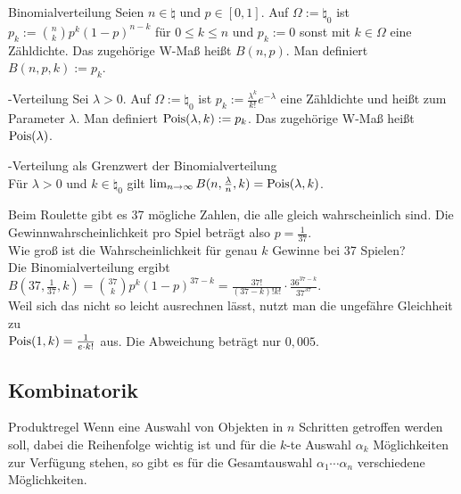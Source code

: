 \linie
\pagebreak

\begin{Def}{Binomialverteilung}
    Seien $n \in \natural$ und $p \in [0, 1]$.
    Auf $\Omega := \natural_0$ ist $p_k := \binom{n}{k} p^k (1 - p)^{n-k}$ für $0 \le k \le n$
    und $p_k := 0$ sonst mit $k \in \Omega$ eine Zähldichte.
    Das zugehörige W-Maß heißt  $B(n, p)$.
    Man definiert $B(n, p, k) := p_k$.
\end{Def}

\begin{Def}{-Verteilung}
    Sei $\lambda > 0$.
    Auf $\Omega := \natural_0$ ist $p_k := \frac{\lambda^k}{k!} e^{-\lambda}$ eine Zähldichte
    und heißt  zum Parameter $\lambda$.
    Man definiert $\text{Pois}(\lambda, k) := p_k$.
    Das zugehörige W-Maß heißt  $\text{Pois}(\lambda)$.
\end{Def}

\begin{Satz}{-Verteilung als Grenzwert der Binomialverteilung}\\
    Für $\lambda > 0$ und $k \in \natural_0$ gilt
    $\lim_{n \to \infty} B(n, \frac{\lambda}{n}, k) = \text{Pois}(\lambda, k)$.
\end{Satz}

\begin{Bsp}
    Beim Roulette gibt es 37 mögliche Zahlen, die alle gleich wahrscheinlich sind.
    Die Gewinnwahrscheinlichkeit pro Spiel beträgt also $p = \frac{1}{37}$.\\
    Wie groß ist die Wahrscheinlichkeit für genau $k$ Gewinne bei 37 Spielen?\\
    Die Binomialverteilung ergibt $B(37, \frac{1}{37}, k) = \binom{37}{k} p^k (1 - p)^{37-k} =
    \frac{37!}{(37 - k)! k!} \cdot \frac{36^{37-k}}{37^{37}}$.\\
    Weil sich das nicht so leicht ausrechnen lässt, nutzt man die ungefähre Gleichheit zu\\
    $\text{Pois}(1, k) = \frac{1}{e \cdot k!}$ aus.
    Die Abweichung beträgt nur $0{,}005$.
\end{Bsp}

\subsection{%
    Kombinatorik%
}

\begin{Satz}{Produktregel}
    Wenn eine Auswahl von Objekten in $n$ Schritten getroffen werden soll, dabei die Reihenfolge
    wichtig ist und für die $k$-te Auswahl $\alpha_k$ Möglichkeiten zur Verfügung stehen,
    so gibt es für die Gesamtauswahl $\alpha_1  \dotsm \alpha_n$ verschiedene
    Möglichkeiten.
\end{Satz}

